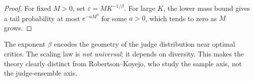 \begin{proof}
For fixed $M>0$, set $\varepsilon=M K^{-1/\beta}$.
For large $K$, the lower mass bound gives a tail probability at most $e^{-a M^\beta}$ for some $a>0$, which tends to zero as $M$ grows.
\end{proof}

\begin{remark}
The exponent $\beta$ encodes the geometry of the judge distribution near
optimal critics. The scaling law is \emph{not universal}; it depends on
diversity. This makes the theory clearly distinct from Robertson--Koyejo,
who study the sample axis, not the judge-ensemble axis.
\end{remark}
